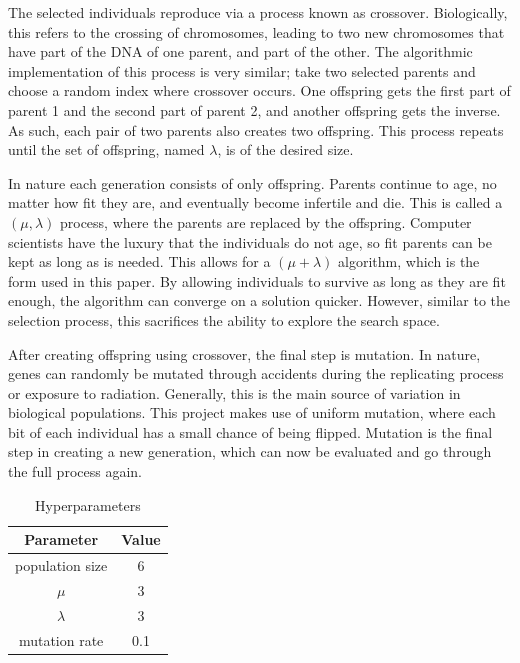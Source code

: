 \documentclass{article}
\begin{document}
The selected individuals reproduce via a process known as crossover. Biologically, this refers to the crossing of chromosomes, leading to two new chromosomes that have part of the DNA of one parent, and part of the other. The algorithmic implementation of this process is very similar; take two selected parents and choose a random index where crossover occurs. One offspring gets the first part of parent 1 and the second part of parent 2, and another offspring gets the inverse. As such, each pair of two parents also creates two offspring. This process repeats until the set of offspring, named $\lambda$, is of the desired size. 

In nature each generation consists of only offspring. Parents continue to age, no matter how fit they are, and eventually become infertile and die. This is called a $(\mu, \lambda)$ process, where the parents are replaced by the offspring. Computer scientists have the luxury that the individuals do not age, so fit parents can be kept as long as is needed. This allows for a $(\mu+\lambda)$ algorithm, which is the form used in this paper. By allowing individuals to survive as long as they are fit enough, the algorithm can converge on a solution quicker. However, similar to the selection process, this sacrifices the ability to explore the search space. 

After creating offspring using crossover, the final step is mutation. In nature, genes can randomly be mutated through accidents during the replicating process or exposure to radiation. Generally, this is the main source of variation in biological populations. This project makes use of uniform mutation, where each bit of each individual has a small chance of being flipped. Mutation is the final step in creating a new generation, which can now be evaluated and go through the full process again. 

\begin{table}[htbp]
    \centering
    \begin{tabular}
        {|c|c|}
        \toprule
        \textbf{Parameter} & \textbf{Value} \\
        \midrule
        population size & 6 \\
        $\mu$           & 3 \\
        $\lambda$       & 3 \\
        mutation rate   & 0.1 \\
        \bottomrule
    \end{tabular}
    \caption{Hyperparameters}
    \label{tab:hyper}
\end{table}
\end{document}
